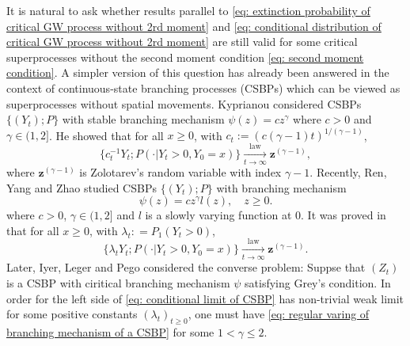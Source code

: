 \documentclass[12pt, a4paper]{amsart}
\theoremstyle{definition}
\numberwithin{equation}{section}
\begin{document}
	It is natural to ask whether results parallel to \eqref{eq: extinction probability of critical GW process without 2rd moment} and \eqref{eq: conditional distribution of critical GW process without 2rd moment} are still valid for some critical superprocesses without the second moment condition \eqref{eq: second moment condition}.
	A simpler
	version of this question has already been answered in the context of continuous-state branching processes %
	(CSBPs)
	which can be viewed as superprocesses without spatial movements.
	Kyprianou \cite{Kyprianou2008Continuous} considered 
	CSBPs $\{(Y_t); P\}$
	with stable branching mechanism $\psi(z) =c z^\gamma$ where $c > 0$ and $\gamma \in (1,2]$. He showed that for all $x\geq 0$, with $c_t := (c(\gamma - 1)t)^{1/(\gamma - 1)}$,
\[ \label{eq: conditional limit of CSBP with stable branching}
	\{c_t^{-1}Y_t; P( \cdot |Y_t > 0,Y_0 = x)\}
	\xrightarrow[t\to \infty]{\operatorname{law}} \mathbf z^{(\gamma - 1)},
\]
    where $\mathbf z^{(\gamma - 1)}$ is Zolotarev's random variable with index $\gamma - 1$.
	Recently, Ren, Yang and Zhao \cite{RenYangZhao2014Conditional} studied 
	CSBPs $\{(Y_t); P\}$
	with branching mechanism
\[\label{eq: regular varing of branching mechanism of a CSBP}
	\psi(z)
	= c z^\gamma l(z),
	\quad z\geq 0.
\]
	where $c > 0$, $\gamma \in (1,2]$ and $l$ is a slowly varying function at $0$.
It was proved in  \cite{RenYangZhao2014Conditional} that for all $x\geq 0$, with $\lambda_t: = P_1(Y_t > 0)$,
\[\label{eq: conditional limit of CSBP}
	\{ \lambda_t Y_t ; P(\cdot | Y_t > 0, Y_0 = x)\}
	\xrightarrow[t\to \infty]{\operatorname{law}} \mathbf z^{(\gamma - 1)}.
\]
	Later, Iyer, Leger and Pego \cite{IyerLegerPego2015Limit} considered the converse problem: Suppse that $(Z_t)$ is a CSBP with ciritical branching mechanism $\psi$ 
	satisfying Grey's condition.
	In order for the left side of \eqref{eq: conditional limit of CSBP} has non-trivial weak limit for 
	some positive constants $(\lambda_t)_{t\geq 0}$, 
	one must have \eqref{eq: regular varing of branching mechanism of a CSBP} for some $1< \gamma \leq 2$.
	
\end{document}
